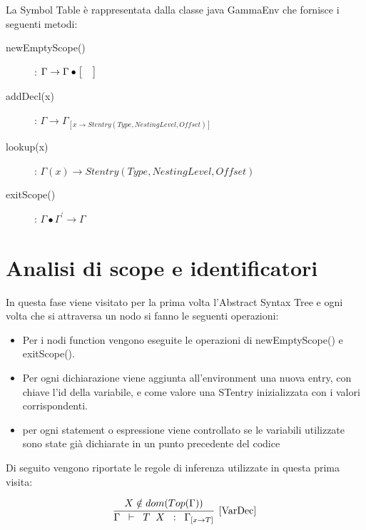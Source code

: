 \documentclass[12pt,twoside,openright,a4paper]{report}
\begin{document}
La Symbol Table è rappresentata dalla classe java GammaEnv che fornisce i seguenti metodi:

\begin{description}
    \item[newEmptyScope(\hspace{0.3cm})] : $ \Gamma \to \Gamma \bullet \bigl[\hspace{0.35cm}\bigr ]$
    \item[addDecl(x)] :  $ \Gamma \rightarrow \Gamma _{[x \to Stentry(Type,NestingLevel,Offset)]} $
    \item[lookup(x)] : $ \Gamma (x) \rightarrow Stentry(Type,NestingLevel,Offset) $
    \item[exitScope(\hspace{0.3cm})] : $ \Gamma \bullet \Gamma^{'} \to \Gamma $
    
\end{description}

\section{Analisi di scope e identificatori}
In questa fase viene visitato per la prima volta l'Abstract Syntax Tree e ogni volta che si attraversa un nodo si fanno le seguenti operazioni:
\begin{itemize}
    \item Per i nodi function vengono eseguite le operazioni di newEmptyScope() e exitScope(). 
    \item Per ogni dichiarazione viene aggiunta all'environment una nuova entry, con chiave l'id della variabile, e come valore una STentry inizializzata con i valori corrispondenti.
    \item per ogni statement o espressione viene controllato se le variabili utilizzate sono state già dichiarate in un punto precedente del codice
\end{itemize}

Di seguito vengono riportate le regole di inferenza utilizzate in questa prima visita:
    

\begin{align*}
\infer[\mathrm{[VarDec]}]
{\Gamma  \hspace{0.2cm} \vdash \hspace{0.2cm} T \hspace{0.2cm} X \hspace{0.2cm} : \hspace{0.2cm} \Gamma _{[x \to T]}} 
{  X \notin dom(Top(\Gamma)) }
\end{align*}
\end{document}
